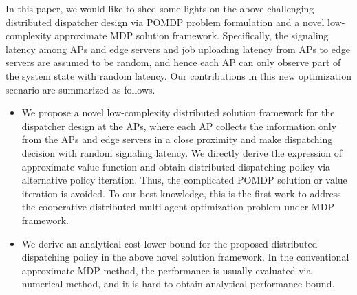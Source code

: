 In this paper, we would like to shed some lights on the above challenging distributed dispatcher design via POMDP problem formulation and a novel low-complexity approximate MDP solution framework.
Specifically, the signaling latency among APs and edge servers and job uploading latency from APs to edge servers are assumed to be random, and hence each AP can only observe part of the system state with random latency.
Our contributions in this new optimization scenario are summarized as follows.
\begin{itemize}
    \item We propose a novel low-complexity distributed solution framework for the dispatcher design at the APs, where each AP collects the information only from the APs and edge servers in a close proximity and make dispatching decision with random signaling latency. We directly derive the expression of approximate value function and obtain distributed dispatching policy via alternative policy iteration. Thus, the complicated POMDP solution or value iteration is avoided. To our best knowledge, this is the first work to address the cooperative distributed multi-agent optimization problem under MDP framework.
    \item We derive an analytical cost lower bound for the proposed distributed dispatching policy in the above novel solution framework. In the conventional approximate MDP method, the performance is usually evaluated via numerical method, and it is hard to obtain analytical performance bound.
\end{itemize}


